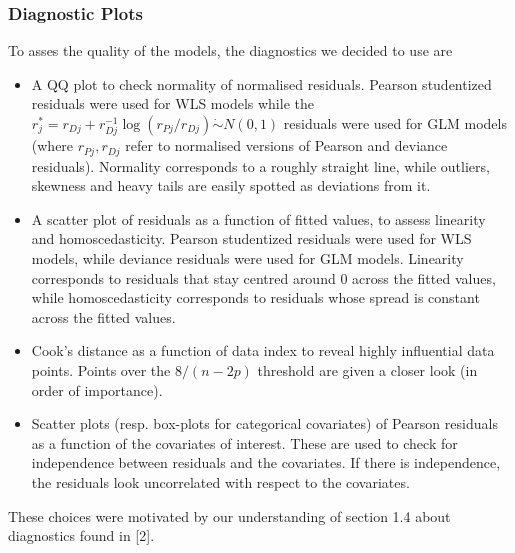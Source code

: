 \documentclass[a4paper, 12pt,oneside]{article}
\begin{document}
			\subsubsection{Diagnostic Plots}
				To asses the quality of the models, the diagnostics we decided to use are 
				\begin{itemize}
					\item A QQ plot to check normality of normalised residuals. Pearson studentized residuals were used for WLS models while the $r_j^*=r_{D j}+r_{D j}^{-1} \log \left(r_{P j} / r_{D j}\right) \dot{\sim} N(0,1)$ residuals were used for GLM models (where $r_{P j},r_{D j}$ refer to normalised versions of Pearson and deviance residuals). Normality corresponds to a roughly straight line, while outliers, skewness and heavy tails are easily spotted as deviations from it.
					\item A scatter plot of residuals as a function of fitted values, to assess linearity and homoscedasticity. Pearson studentized residuals were used for WLS models, while deviance residuals were used for GLM models. Linearity corresponds to residuals that stay centred around 0 across the fitted values, while homoscedasticity corresponds to residuals whose spread is constant across the fitted values.
					\item Cook's distance as a function of data index to reveal highly influential data points. Points over the $8/(n-2p)$ threshold are given a closer look (in order of importance). 
					\item Scatter plots (resp. box-plots for categorical covariates) of Pearson residuals as a function of the covariates of interest. These are used to check for independence between residuals and the covariates. If there is independence, the residuals look uncorrelated with respect to the covariates. 
				\end{itemize}
				These choices were motivated by our understanding of section 1.4 about diagnostics found in [2]. 
\end{document}
